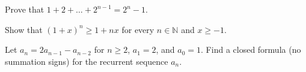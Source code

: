 \documentclass[addpoints,answers]{exam}
\begin{document}
    \pagestyle{headandfoot}
    \runningheadrule

    \firstpagefooter{}{}{}
    \runningfooter{}{}{}
    \begin{flushright}

        \vspace{0.2in}

    \end{flushright}

    \begin{questions}
        \question
            Prove that $1 + 2 + \dots + 2^{n - 1} = 2^n - 1$.
            \begin{solutionorbox}[\stretch{1}]
            \end{solutionorbox}
            \newpage
        \question
            Show that $(1 + x)^n \ge 1 + nx$ for every $n \in \mathbb{N}$ and $x \ge -1$.
            \begin{solutionorbox}[\stretch{1}]
            \end{solutionorbox}
            \newpage
        \question
            Let $a_n = 2 a_{n - 1} - a_{n - 2}$ for $n \ge 2$, $a_1 = 2$, and $a_0 = 1$.
            Find a closed formula (no summation signs) for the recurrent sequence $a_n$.
            \begin{solutionorbox}[\stretch{1}]
            \end{solutionorbox}
            \newpage
\end{questions}
\end{document}

